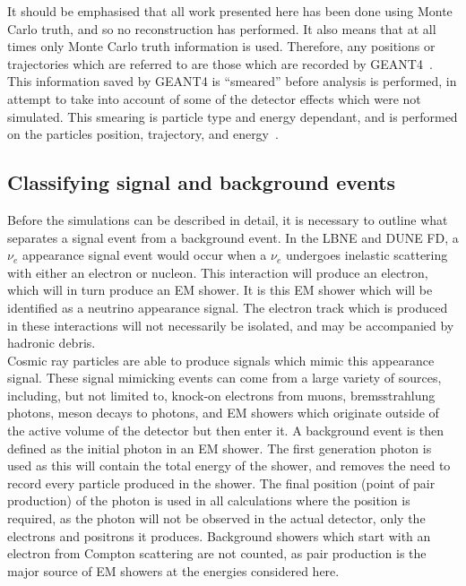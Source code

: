 It should be emphasised that all work presented here has been done using Monte Carlo truth, and so no reconstruction has performed. It also means that at all times only Monte Carlo truth information is used. Therefore, any positions or trajectories which are referred to are those which are recorded by GEANT4~\citep{GEANT4}. This information saved by GEANT4 is ``smeared'' before analysis is performed, in attempt to take into account of some of the detector effects which were not simulated. This smearing is particle type and energy dependant, and is performed on the particles position, trajectory, and energy~\citep{MartinsThesis, LBNE7806}. \\

\subsection{Classifying signal and background events}
Before the simulations can be described in detail, it is necessary to outline what separates a signal event from a background event. In the LBNE and DUNE FD, a $\nu_{e}$ appearance signal event would occur when a $\nu_{e}$ undergoes inelastic scattering with either an electron or nucleon. This interaction will produce an electron, which will in turn produce an EM shower. It is this EM shower which will be identified as a neutrino appearance signal. The electron track which is produced in these interactions will not necessarily be isolated, and may be accompanied by hadronic debris. \\

Cosmic ray particles are able to produce signals which mimic this appearance signal. These signal mimicking events can come from a large variety of sources, including, but not limited to, knock-on electrons from muons, bremsstrahlung photons, meson decays to photons, and EM showers which originate outside of the active volume of the detector but then enter it. A background event is then defined as the initial photon in an EM shower. The first generation photon is used as this will contain the total energy of the shower, and removes the need to record every particle produced in the shower. The final position (point of pair production) of the photon is used in all calculations where the position is required, as the photon will not be observed in the actual detector, only the electrons and positrons it produces. Background showers which start with an electron from Compton scattering are not counted, as pair production is the major source of EM showers at the energies considered here. \\

